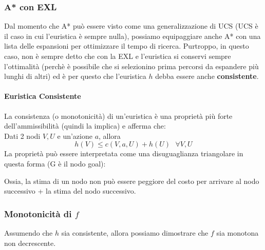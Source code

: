 \subsubsection{A* con EXL}
Dal momento che A* può essere visto come una generalizzazione di UCS (UCS è il caso in cui l'euristica è sempre nulla), possiamo
equipaggiare anche A* con una lista delle espansioni per ottimizzare il tempo di ricerca. Purtroppo, in questo caso, non è sempre detto
che con la EXL e l'euristica si conservi sempre l'ottimalità (perchè è possibile che si selezionino prima percorsi da espandere più lunghi di altri) ed è
per questo che l'euristica $h$ debba essere anche \textbf{consistente}.

\paragraph{Euristica Consistente}
La consistenza (o monotonicità) di un'euristica è una proprietà più forte dell'ammissibilità (quindi la implica) e afferma che:\\
Dati 2 nodi $V,U$ e un'azione $a$, allora
\begin{equation}
    h(V) \leq c(V,a,U) + h(U) \mbox{  } \forall V,U
\end{equation}
La proprietà può essere interpretata come una disuguaglianza triangolare in questa forma (G è il nodo goal):
\begin{center}
\end{center}
Ossia, la stima di un nodo non può essere peggiore del costo per arrivare al nodo successivo + la stima del nodo successivo.

\subsubsection{Monotonicità di $f$}
Assumendo che $h$ sia consistente, allora possiamo dimostrare che $f$ sia monotona non decrescente.
